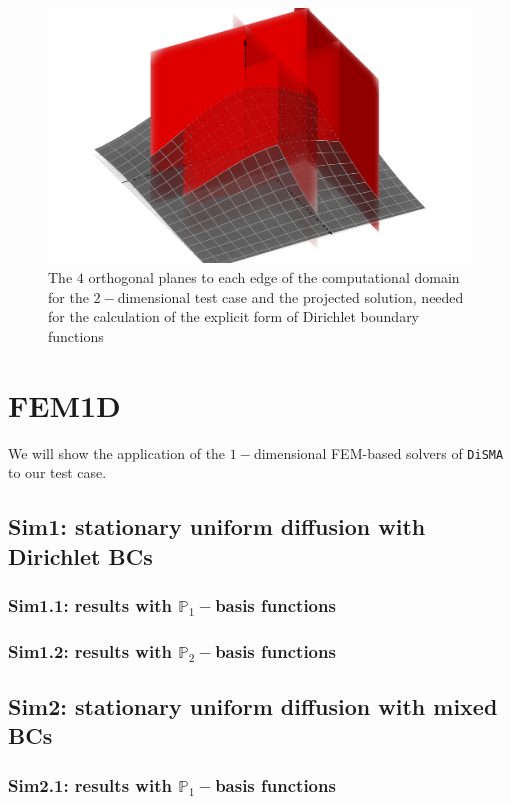 \documentclass[12pt,openany,twoside,a4paper]{article}
\newcommand{\code}[1]{\colorbox{light-gray}{\texttt{#1}}}
\begin{document}
\begin{figure}[H]
    \centering
    \includegraphics[keepaspectratio, width = \textwidth]{geomSolPlanes.png}
    \caption{The $4$ orthogonal planes to each edge of the computational domain for the $2-$dimensional test case and the projected solution, needed for the calculation of the explicit form of Dirichlet boundary functions}
    \label{geomSolPlanes}
\end{figure}

\newpage
\section{FEM1D}
We will show the application of the $1-$dimensional FEM-based solvers of \code{DiSMA} to our test case.
\subsection{Sim1: stationary uniform diffusion with Dirichlet BCs}
\subsubsection{Sim1.1: results with $\mathbb{P}_1-$basis functions}
\subsubsection{Sim1.2: results with $\mathbb{P}_2-$basis functions}
\subsection{Sim2: stationary uniform diffusion with mixed BCs}
\subsubsection{Sim2.1: results with $\mathbb{P}_1-$basis functions}
\end{document}
